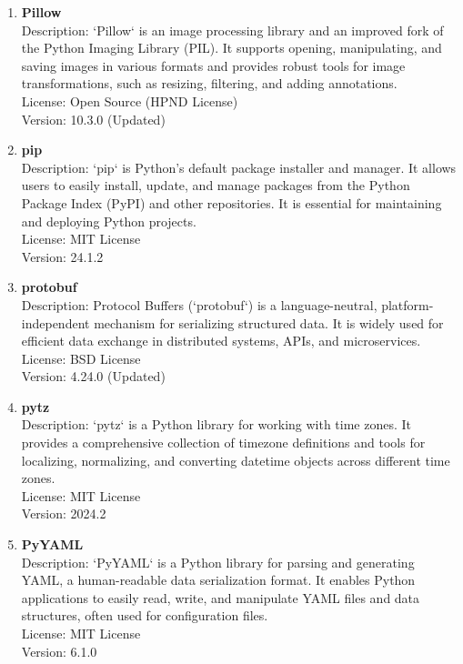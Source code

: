 \begin{enumerate}
	\item \textbf{Pillow} \\
	Description: `Pillow` is an image processing library and an improved fork of the Python Imaging Library (PIL). It supports opening, manipulating, and saving images in various formats and provides robust tools for image transformations, such as resizing, filtering, and adding annotations. \\
	License: Open Source (HPND License) \\
	Version: 10.3.0 (Updated)
	
	\item \textbf{pip} \\
	Description: `pip` is Python’s default package installer and manager. It allows users to easily install, update, and manage packages from the Python Package Index (PyPI) and other repositories. It is essential for maintaining and deploying Python projects. \\
	License: MIT License \\
	Version: 24.1.2
	
	\item \textbf{protobuf} \\
	Description: Protocol Buffers (`protobuf`) is a language-neutral, platform-independent mechanism for serializing structured data. It is widely used for efficient data exchange in distributed systems, APIs, and microservices. \\
	License: BSD License \\
	Version: 4.24.0 (Updated)
	
	\item \textbf{pytz} \\
	Description: `pytz` is a Python library for working with time zones. It provides a comprehensive collection of timezone definitions and tools for localizing, normalizing, and converting datetime objects across different time zones. \\
	License: MIT License \\
	Version: 2024.2
	
	\item \textbf{PyYAML} \\
	Description: `PyYAML` is a Python library for parsing and generating YAML, a human-readable data serialization format. It enables Python applications to easily read, write, and manipulate YAML files and data structures, often used for configuration files. \\
	License: MIT License \\
	Version: 6.1.0
	

\end{enumerate}
